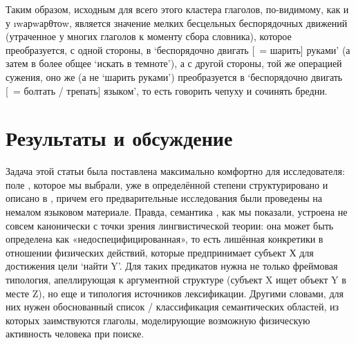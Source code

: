 Таким образом, исходным для всего этого кластера глаголов, по-видимому, как и у \i{wарwарθтоw}, является значение мелких бесцельных беспорядочных движений (утраченное у многих глаголов к моменту сбора словника), которое преобразуется, с одной стороны, в ‘беспорядочно двигать [~= шарить] руками’ (а затем в более общее ‘искать в темноте’), а с другой стороны, той же операцией сужения, оно же (а не ‘шарить руками’) преобразуется в ‘беспорядочно двигать [~= болтать / трепать] языком’, то есть говорить чепуху и сочинять бредни.

\section{Результаты и обсуждение} \label{search-results}

Задача этой статьи была поставлена максимально комфортно для исследователя: поле , которое мы выбрали, уже в определённой степени структурировано и описано в \parencite{eureka2018}, причем его предварительные исследования были проведены на немалом языковом материале. Правда, семантика , как мы показали, устроена не совсем канонически с точки зрения лингвистической теории: она может быть определена как «недоспецифицированная», то есть лишённая конкретики в отношении физических действий, которые предпринимает субъект Х для достижения цели ‘найти Y’. Для таких предикатов нужна не только фреймовая типология, апеллирующая к аргументной структуре (субъект X ищет объект Y в месте Z), но еще и типология источников лексификации. Другими словами, для них нужен обоснованный список / классификация семантических областей, из которых заимствуются глаголы, моделирующие возможную физическую активность человека при поиске.

